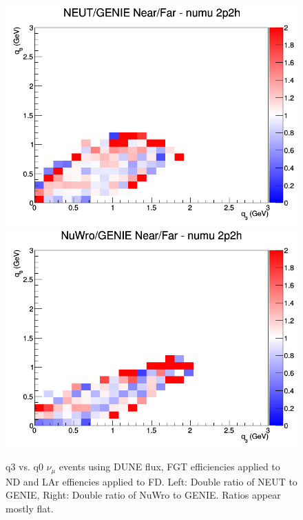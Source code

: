 \documentclass[12pt]{article}
\begin{document}
\begin{figure}[h]
\centering
{}
\includegraphics[width=\linewidth]{eff_q0_q3/FGT/ratios/2p2h_NEUT_GENIE_numu_NF_q3_q0.png}
\endminipage
{}
\includegraphics[width=\linewidth]{eff_q0_q3/FGT/ratios/2p2h_NuWro_GENIE_numu_NF_q3_q0.png}
\endminipage
\caption{q3 vs. q0 $\nu_{\mu}$ events using DUNE flux, FGT efficiencies applied to ND and LAr effiencies applied to FD. Left: Double ratio of NEUT to GENIE, Right: Double ratio of NuWro to GENIE. Ratios appear mostly flat.}
\label{fig:q0q3_numu_2p2h_FGT_eff}
\end{figure}
\end{document}
